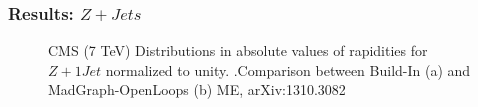 \documentclass{beamer}
\numberwithin{figure}{section}
\begin{document}
\begin{frame}
 \frametitle{Results: $Z+Jets$} 

\begin{figure}[!tbp]
  \centering
  \hfill
  \caption{\scriptsize{CMS (7 TeV) Distributions in absolute values of rapidities for $Z+ 1 Jet$ normalized to unity. .Comparison between Build-In (a) and MadGraph-OpenLoops (b) ME, arXiv:1310.3082}}
\end{figure}
 

\end{frame}
\end{document}
